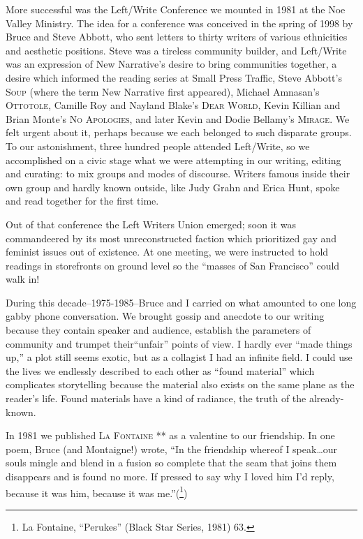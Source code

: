 \documentclass[
]{memoir}
\begin{document}
More successful was the Left/Write Conference we mounted in 1981 at the
Noe Valley Ministry. The idea for a conference was conceived in the
spring of 1998 by Bruce and Steve Abbott, who sent letters to thirty
writers of various ethnicities and aesthetic positions. Steve was a
tireless community builder, and Left/Write was an expression of New
Narrative's desire to bring communities together, a desire which
informed the reading series at Small Press Traffic, Steve Abbott's
\textsc{Soup} (where the term New Narrative first appeared), Michael
Amnasan's \textsc{Ottotole}, Camille Roy and Nayland Blake's
\textsc{Dear World}, Kevin Killian and Brian Monte's \textsc{No
Apologies}, and later Kevin and Dodie Bellamy's \textsc{Mirage}. We felt
urgent about it, perhaps because we each belonged to such disparate
groups. To our astonishment, three hundred people attended Left/Write,
so we accomplished on a civic stage what we were attempting in our
writing, editing and curating: to mix groups and modes of discourse.
Writers famous inside their own group and hardly known outside, like
Judy Grahn and Erica Hunt, spoke and read together for the first time.

Out of that conference the Left Writers Union emerged; soon it was
commandeered by its most unreconstructed faction which prioritized gay
and feminist issues out of existence. At one meeting, we were instructed
to hold readings in storefronts on ground level so the ``masses of San
Francisco'' could walk in!

During this decade--1975-1985--Bruce and I carried on what amounted to
one long gabby phone conversation. We brought gossip and anecdote to our
writing because they contain speaker and audience, establish the
parameters of community and trumpet their``unfair'' points of view. I
hardly ever ``made things up,'' a plot still seems exotic, but as a
collagist I had an infinite field. I could use the lives we endlessly
described to each other as ``found material'' which complicates
storytelling because the material also exists on the same plane as the
reader's life. Found materials have a kind of radiance, the truth of the
already-known.

In 1981 we published \textsc{La Fontaine} ** as a valentine to our
friendship. In one poem, Bruce (and Montaigne!) wrote, ``In the
friendship whereof I speak\ldots{}our souls mingle and blend in a fusion
so complete that the seam that joins them disappears and is found no
more. If pressed to say why I loved him I'd reply, because it was him,
because it was me.''(\footnote{La Fontaine, ``Perukes'' (Black Star
  Series, 1981) 63.})
\end{document}
